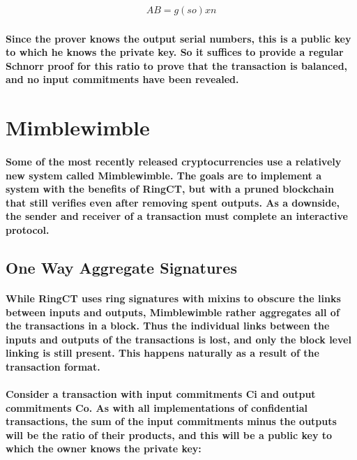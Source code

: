 \documentclass{article}
\begin{document}
\begin{eqnarray}
  AB=g( so) xn
\end{eqnarray}

\paragraph{Since the prover knows the output serial numbers, this is a public key to which he knows the private key.  So it suffices to provide a regular Schnorr proof for this ratio to prove that the transaction is balanced, and no input commitments have been revealed.}



\section{Mimblewimble}

\paragraph{Some of the most recently released cryptocurrencies use a relatively new system called Mimblewimble.  The goals are to implement a system with the benefits of RingCT, but with a pruned blockchain that still verifies even after removing spent outputs.  As a downside, the sender and receiver of a transaction must complete an interactive protocol.}


\subsection{One Way Aggregate Signatures}

\paragraph{While RingCT uses ring signatures with mixins to obscure the links between inputs and outputs, Mimblewimble rather aggregates all of the transactions in a block.  Thus the individual links between the inputs and outputs of the transactions is lost, and only the block level linking is still present.  This happens naturally as a result of the transaction format.}

\paragraph{Consider a transaction with input commitments Ci and output commitments Co.  As with all implementations of confidential transactions, the sum of the input commitments minus the outputs will be the ratio of their products, and this will be a public key to which the owner knows the private key:}
\end{document}

